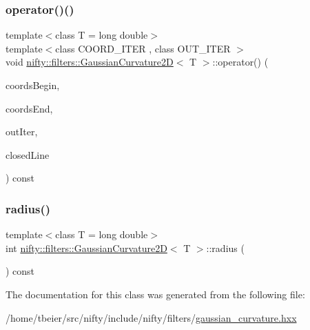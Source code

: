 \mbox{\label{classnifty_1_1filters_1_1GaussianCurvature2D_ab4db1b2a7b3a72cb2861f2aa828d3573}} 
\subsubsection{\texorpdfstring{operator()()}{operator()()}\hspace{0.1cm}{\footnotesize\ttfamily [2/2]}}
{\footnotesize\ttfamily template$<$class T = long double$>$ \\
template$<$class C\+O\+O\+R\+D\+\_\+\+I\+T\+ER , class O\+U\+T\+\_\+\+I\+T\+ER $>$ \\
void \hyperlink{classnifty_1_1filters_1_1GaussianCurvature2D}{nifty\+::filters\+::\+Gaussian\+Curvature2D}$<$ T $>$\+::operator() (\begin{DoxyParamCaption}\item[{C\+O\+O\+R\+D\+\_\+\+I\+T\+ER}]{coords\+Begin,  }\item[{C\+O\+O\+R\+D\+\_\+\+I\+T\+ER}]{coords\+End,  }\item[{O\+U\+T\+\_\+\+I\+T\+ER}]{out\+Iter,  }\item[{const bool}]{closed\+Line }\end{DoxyParamCaption}) const\hspace{0.3cm}{\ttfamily [inline]}}

\mbox{\label{classnifty_1_1filters_1_1GaussianCurvature2D_a75235b815cc479bbd34cf75118fb82d3}} 
\subsubsection{\texorpdfstring{radius()}{radius()}}
{\footnotesize\ttfamily template$<$class T = long double$>$ \\
int \hyperlink{classnifty_1_1filters_1_1GaussianCurvature2D}{nifty\+::filters\+::\+Gaussian\+Curvature2D}$<$ T $>$\+::radius (\begin{DoxyParamCaption}{ }\end{DoxyParamCaption}) const\hspace{0.3cm}{\ttfamily [inline]}}



The documentation for this class was generated from the following file\+:\begin{DoxyCompactItemize}
\item 
/home/tbeier/src/nifty/include/nifty/filters/\hyperlink{gaussian__curvature_8hxx}{gaussian\+\_\+curvature.\+hxx}\end{DoxyCompactItemize}
